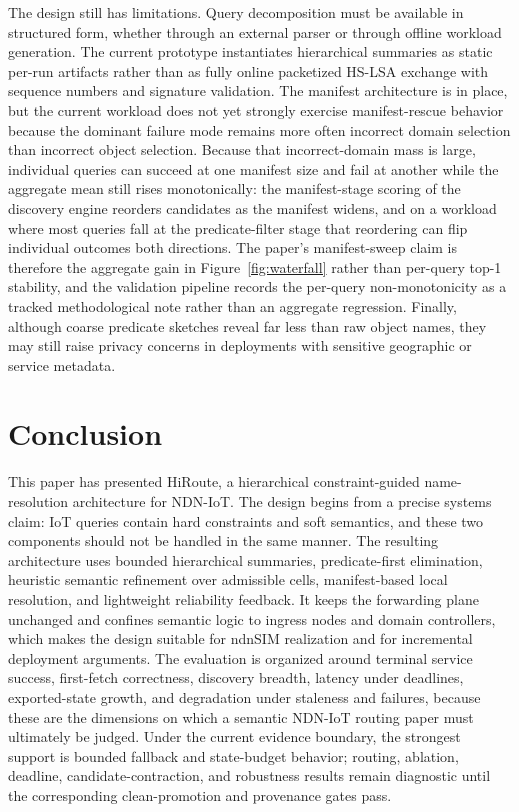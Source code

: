 \documentclass[journal]{IEEEtran}
\newcommand{\sysname}{HiRoute}
\newcommand{\hslsa}{HS-LSA}
\begin{document}
The design still has limitations. Query decomposition must be available in structured form, whether through an external parser or through offline workload generation. The current prototype instantiates hierarchical summaries as static per-run artifacts rather than as fully online packetized \hslsa{} exchange with sequence numbers and signature validation. The manifest architecture is in place, but the current workload does not yet strongly exercise manifest-rescue behavior because the dominant failure mode remains more often incorrect domain selection than incorrect object selection. Because that incorrect-domain mass is large, individual queries can succeed at one manifest size and fail at another while the aggregate mean still rises monotonically: the manifest-stage scoring of the discovery engine reorders candidates as the manifest widens, and on a workload where most queries fall at the predicate-filter stage that reordering can flip individual outcomes both directions. The paper's manifest-sweep claim is therefore the aggregate gain in Figure~\ref{fig:waterfall} rather than per-query top-1 stability, and the validation pipeline records the per-query non-monotonicity as a tracked methodological note rather than an aggregate regression. Finally, although coarse predicate sketches reveal far less than raw object names, they may still raise privacy concerns in deployments with sensitive geographic or service metadata.

\section{Conclusion}

This paper has presented \sysname{}, a hierarchical constraint-guided name-resolution architecture for NDN-IoT. The design begins from a precise systems claim: IoT queries contain hard constraints and soft semantics, and these two components should not be handled in the same manner. The resulting architecture uses bounded hierarchical summaries, predicate-first elimination, heuristic semantic refinement over admissible cells, manifest-based local resolution, and lightweight reliability feedback. It keeps the forwarding plane unchanged and confines semantic logic to ingress nodes and domain controllers, which makes the design suitable for ndnSIM realization and for incremental deployment arguments. The evaluation is organized around terminal service success, first-fetch correctness, discovery breadth, latency under deadlines, exported-state growth, and degradation under staleness and failures, because these are the dimensions on which a semantic NDN-IoT routing paper must ultimately be judged. Under the current evidence boundary, the strongest support is bounded fallback and state-budget behavior; routing, ablation, deadline, candidate-contraction, and robustness results remain diagnostic until the corresponding clean-promotion and provenance gates pass.
\end{document}
